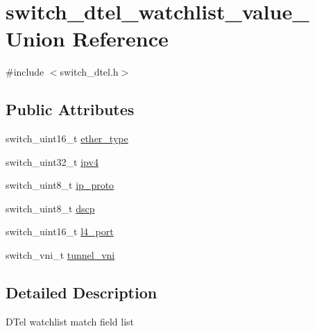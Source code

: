 \hypertarget{unionswitch__dtel__watchlist__value__}{\section{switch\+\_\+dtel\+\_\+watchlist\+\_\+value\+\_\+ Union Reference}
\label{unionswitch__dtel__watchlist__value__}
}


{\ttfamily \#include $<$switch\+\_\+dtel.\+h$>$}

\subsection*{Public Attributes}
\begin{DoxyCompactItemize}
\item 
switch\+\_\+uint16\+\_\+t \hyperlink{unionswitch__dtel__watchlist__value___ac0d010dabd7a4bcb6acc3255130f7b18}{ether\+\_\+type}
\item 
switch\+\_\+uint32\+\_\+t \hyperlink{unionswitch__dtel__watchlist__value___a1fd7f57b1a99ed89273069d12a3d6c64}{ipv4}
\item 
switch\+\_\+uint8\+\_\+t \hyperlink{unionswitch__dtel__watchlist__value___abd6fb65d21280fe04ef06a67db571f69}{ip\+\_\+proto}
\item 
switch\+\_\+uint8\+\_\+t \hyperlink{unionswitch__dtel__watchlist__value___ae31223b6628267d278ea12b2b3051b0f}{dscp}
\item 
switch\+\_\+uint16\+\_\+t \hyperlink{unionswitch__dtel__watchlist__value___a10ce4486b1fe3b42da1f5bc43c19438f}{l4\+\_\+port}
\item 
switch\+\_\+vni\+\_\+t \hyperlink{unionswitch__dtel__watchlist__value___a2964f13afb2b7837f86ba8cf1d394c7a}{tunnel\+\_\+vni}
\end{DoxyCompactItemize}


\subsection{Detailed Description}
D\+Tel watchlist match field list 

